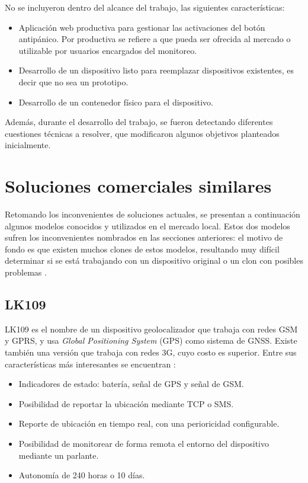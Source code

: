 No se incluyeron dentro del alcance del trabajo, las siguientes características:

\begin{itemize}
\item Aplicación web productiva para gestionar las activaciones del botón antipánico. Por productiva se refiere a que pueda ser ofrecida al mercado o utilizable por usuarios encargados del monitoreo.
\item Desarrollo de un dispositivo listo para reemplazar dispositivos existentes, es decir que no sea un prototipo.
\item Desarrollo de un contenedor físico para el dispositivo.
\end{itemize}

Además, durante el desarrollo del trabajo, se fueron detectando diferentes cuestiones técnicas a resolver, que modificaron algunos objetivos planteados inicialmente.


\section{Soluciones comerciales similares}

Retomando los inconvenientes de soluciones actuales, se presentan a continuación algunos modelos conocidos y utilizados en el mercado local. Estos dos modelos sufren los inconvenientes nombrados en las secciones anteriores: el motivo de fondo es que existen muchos clones de estos modelos, resultando muy difícil determinar si se está trabajando con un dispositivo original o un clon con posibles problemas \citep{CLONES:1}.
\subsection{LK109}

LK109 es el nombre de un dispositivo geolocalizador que trabaja con redes GSM y GPRS, y usa \textit{Global Positioning System} (GPS) como sistema de GNSS. Existe también una versión que trabaja con redes 3G, cuyo costo es superior. Entre sus características más interesantes se encuentran \citep{LK109MANUAL:1}:
\begin{itemize}
\item Indicadores de estado: batería, señal de GPS y señal de GSM.
\item Posibilidad de reportar la ubicación mediante TCP o SMS.
\item Reporte de ubicación en tiempo real, con una perioricidad configurable.
\item Posibilidad de monitorear de forma remota el entorno del dispositivo mediante un parlante.
\item Autonomía de 240 horas o 10 días.
\end{itemize}

